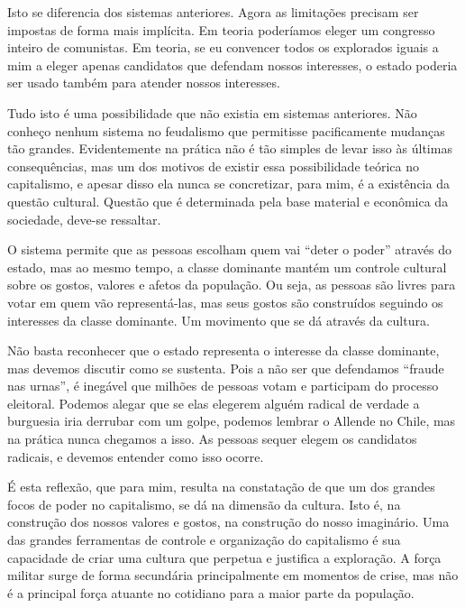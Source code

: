 Isto se diferencia dos sistemas anteriores. Agora as limitações precisam ser impostas de forma mais implícita. Em teoria poderíamos eleger um congresso inteiro de comunistas. Em teoria, se eu convencer todos os explorados iguais a mim a eleger apenas candidatos que defendam nossos interesses, o estado poderia ser usado também  para atender nossos interesses.

Tudo isto é uma possibilidade que não existia em sistemas anteriores. Não conheço nenhum sistema no feudalismo que permitisse pacificamente mudanças tão grandes. Evidentemente na prática não é tão simples de levar isso às últimas consequências, mas um dos motivos de existir essa possibilidade teórica no capitalismo, e apesar disso ela nunca se concretizar, para mim, é a existência da questão cultural. Questão que é determinada pela base material e econômica da sociedade, deve-se ressaltar.

O sistema permite que as pessoas escolham quem vai “deter o poder” através do estado, mas ao mesmo tempo, a classe dominante mantém um controle cultural sobre os gostos, valores e afetos da população. Ou seja, as pessoas são livres para votar em quem vão representá-las, mas seus gostos são construídos seguindo os interesses da classe dominante. Um movimento que se dá através da cultura.

Não basta reconhecer que o estado representa o interesse da classe dominante, mas devemos discutir como se sustenta. Pois a não ser que defendamos “fraude nas urnas”, é inegável que milhões de pessoas votam e participam do processo eleitoral. Podemos alegar que se elas elegerem alguém radical de verdade a burguesia iria derrubar com um golpe, podemos lembrar o Allende no Chile, mas na prática nunca chegamos a isso. As pessoas sequer elegem os candidatos radicais, e devemos entender como isso ocorre.

É esta reflexão, que para mim, resulta na constatação de que um dos grandes focos de poder no capitalismo, se dá na dimensão da cultura. Isto é, na construção dos nossos valores e gostos, na construção do nosso imaginário. Uma das grandes ferramentas de controle e organização do capitalismo é sua capacidade de criar uma cultura que perpetua e justifica a exploração. A força militar surge de forma secundária principalmente em momentos de crise, mas não é a principal força atuante no cotidiano para a maior parte da população.

